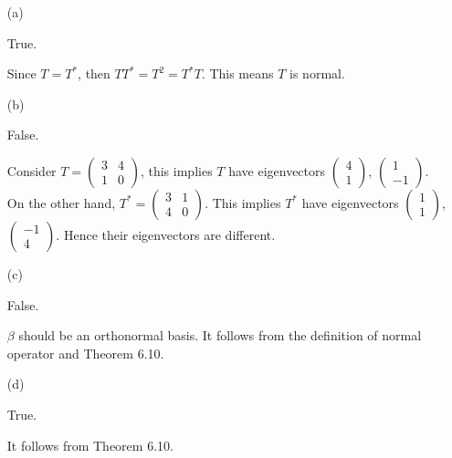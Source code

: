 \begin{Exercise}
\begin{enumerate}[(a)]
\item[(a)]
\begin{answer}
True.
\end{answer}
\begin{solution}
Since $T = T^*$, then $T T^* = T^2 = T^* T$. This means $T$ is normal.
\end{solution}

\item[(b)]
\begin{answer}
False.
\end{answer}
\begin{solution}
Consider $T = \begin{pmatrix}
3 & 4 \\
1 & 0
\end{pmatrix}$, this implies $T$ have eigenvectors $\begin{pmatrix}
4 \\
1
\end{pmatrix}$, $\begin{pmatrix}
1 \\
-1
\end{pmatrix}$. On the other hand, $T^* = \begin{pmatrix}
3 & 1 \\
4 & 0
\end{pmatrix}$. This implies $T^*$ have eigenvectors $\begin{pmatrix}
1 \\
1
\end{pmatrix}$, $\begin{pmatrix}
-1 \\
4
\end{pmatrix}$. Hence their eigenvectors are different.
\end{solution}

\item[(c)]
\begin{answer}
False.
\end{answer}
\begin{solution}
$\beta$ should be an orthonormal basis. It follows from the definition of normal operator and Theorem 6.10.
\end{solution}

\item[(d)]
\begin{answer}
True.
\end{answer}
\begin{solution}
It follows from Theorem 6.10.
\end{solution}


\end{enumerate}
\end{Exercise}
